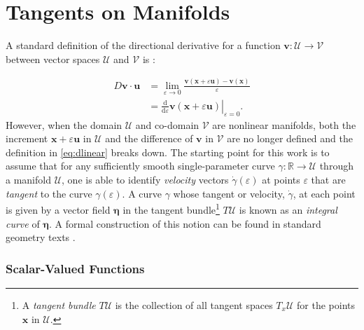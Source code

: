 
\hypertarget{sec:derivatives}{%
\section{Tangents on Manifolds}\label{sec:derivatives}}

A standard definition of the directional derivative for a function
\(\boldsymbol{v}\colon \mathcal{U}\rightarrow\mathcal{V}\) between vector spaces
\(\mathcal{U}\) and \(\mathcal{V}\) is \citep{gurtin1981introduction}:

\begin{equation}
\begin{aligned}
D\boldsymbol{v}\cdot\boldsymbol{u} &= \lim _{\varepsilon \rightarrow 0} \frac{\boldsymbol{v}(\boldsymbol{x}+\varepsilon \boldsymbol{u})- \boldsymbol{v}(\boldsymbol{x})}{\varepsilon} \\
&= \left.\frac{\mathrm{d}}{\mathrm{d} \varepsilon}\boldsymbol{v}(\boldsymbol{x} + \varepsilon\boldsymbol{u})\right|_{\varepsilon=0}.
\end{aligned}
\label{eq:dlinear}
\end{equation}
However, when the domain
\(\mathcal{U}\) and co-domain \(\mathcal{V}\) are nonlinear manifolds,
both the increment \(\boldsymbol{x} + \varepsilon\boldsymbol{u}\) in \(\mathcal{U}\) and the difference of \(\boldsymbol{v}\) in \(\mathcal{V}\)
are no longer defined and 
the definition in \eqref{eq:dlinear} breaks down.
The starting point for  %
this work is to assume that for any sufficiently smooth
single-parameter curve
\(\gamma\colon\mathbb{R} \rightarrow \mathcal{U}\) through a manifold
\(\mathcal{U}\), one is able to identify \emph{velocity} vectors
\(\dot{\gamma}(\varepsilon)\) at points \(\varepsilon\) that are
\emph{tangent} to the curve \(\gamma(\varepsilon)\).
A curve \(\gamma\) whose tangent or velocity, \(\dot{\gamma}\), at each point
is given by a vector field \(\boldsymbol{\eta}\) %
in the tangent bundle\footnote{A \emph{tangent bundle} \(T\mathcal{U}\) is the collection of all tangent spaces \(T_x\mathcal{U}\) for the points \(\boldsymbol{x}\) in \(\mathcal{U}\).} 
\(T\mathcal{U}\)
is known as an \emph{integral curve} of \(\boldsymbol{\eta}\). 
A formal construction of this notion can be found
in standard geometry texts \citep{spivak1979comprehensive}.

\hypertarget{directional-derivatives}{%
\subsubsection{Scalar-Valued Functions}\label{directional-derivatives}}


